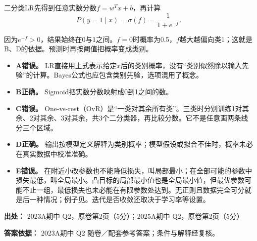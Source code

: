二分类LR先得到任意实数分数\(f=w^Tx+b\)，再计算
\[
P(y=1\mid x)=\sigma(f)=\frac{1}{1+e^{-f}}.
\]


因为\(e^{-f}>0\)，结果始终在0与1之间。\(f=0\)时概率为0.5，\(f\)越大越偏向类1；这就是B、D的依据。预测时再按阈值把概率变成类别。



\begin{itemize}

\item \textbf{A错误。} LR直接用上式表示给定\(x\)后的类别概率，没有“类别似然除以输入先验”的计算。Bayes公式也应包含类别先验，选项混用了概念。

\item \textbf{B正确。} Sigmoid把实数分数映射成0到1之间的数。

\item \textbf{C错误。} One-vs-rest（OvR）是“一类对其余所有类”。三类时分别训练1对其余、2对其余、3对其余，共3个二分类器，再比较分数。它不是任意画两条线分三个区域。

\item \textbf{D正确。} 输出按模型定义解释为类别概率；模型假设或拟合不佳时，概率未必在真实数据中校准准确。

\item \textbf{E错误。} 在附近小改参数也不能降低损失，叫局部最小；在全部可能的参数中损失最低，叫全局最小。凸目标的局部最小值也是全局最小值，但最优参数可能不止一组，最低损失也未必能在有限参数处达到。无正则且数据完全可分就是后一种情况；例子见。迭代是否收敛还取决于学习率等设置。

\end{itemize}


\textbf{出处：} 2023A期中 Q2，原卷第2页（5分）；2025A期中 Q2，原卷第2页（5分）


\textbf{答案依据：} 2023A期中 Q2 随卷／配套参考答案；条件与解释经复核。
